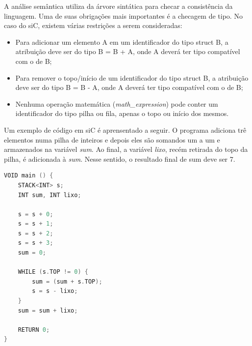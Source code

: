\documentclass[12pt]{article}
\begin{document}
\indent A análise semântica utiliza da árvore sintática para checar a consistência da linguagem. Uma de suas obrigações mais importantes é a checagem de tipo. No caso do siC, existem várias restrições a serem consideradas:
\begin{itemize}
    \item Para adicionar um elemento A em um identificador do tipo struct B, a atribuição deve ser do tipo B = B + A, onde A deverá ter tipo compatível com o de B;
    \item Para remover o topo/início de um identificador do tipo struct B, a atribuição deve ser do tipo B = B - A, onde A deverá ter tipo compatível com o de B;
    \item Nenhuma operação matemática (\textit{math\_expression}) pode conter um identificador do tipo pilha ou fila, apenas o topo ou início dos mesmos.
\end{itemize}


\indent Um exemplo de código em siC é aprensentado a seguir. O programa adiciona trê elementos numa pilha de inteiros e depois eles são somandos um a um e armazenados na variável \textit{sum}. Ao final, a variável \textit{lixo}, recém retirada do topo da pilha, é adicionada à \textit{sum}. Nesse sentido, o resultado final de sum deve ser 7. \\

\begin{lstlisting}[language=C]
VOID main () {
    STACK<INT> s;
    INT sum, INT lixo;

    s = s + 0;
    s = s + 1;
    s = s + 2;
    s = s + 3;    
    sum = 0;
    
    WHILE (s.TOP != 0) {    
        sum = (sum + s.TOP);
        s = s - lixo;
    }
    sum = sum + lixo;

    RETURN 0;
}

\end{lstlisting}



\end{document}
